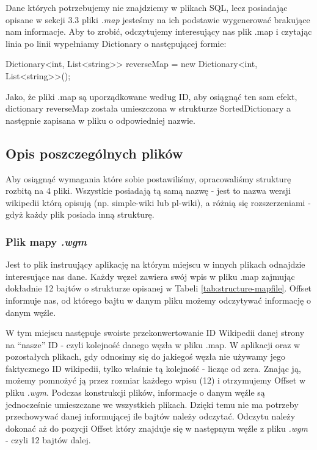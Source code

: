 Dane których potrzebujemy nie znajdziemy w plikach SQL, lecz posiadając opisane w sekcji 3.3 pliki \textit{.map} jesteśmy na ich podstawie wygenerować brakujące nam informacje.
Aby to zrobić, odczytujemy interesujący nas plik .map i czytając linia po linii wypełniamy Dictionary o następującej formie:

Dictionary<int, List<string>> reverseMap = new Dictionary<int, List<string>>();

Jako, że pliki .map są uporządkowane według ID, aby osiągnąć ten sam efekt, dictionary reverseMap została umieszczona w strukturze SortedDictionary a następnie zapisana w pliku o odpowiedniej nazwie.

\subsection{Opis poszczególnych plików}
Aby osiągnąć wymagania które sobie postawiliśmy, opracowaliśmy strukturę rozbitą na 4 pliki. Wszystkie posiadają tą samą nazwę - jest to nazwa wersji wikipedii którą opisują (np. simple-wiki lub pl-wiki), a różnią się rozszerzeniami - gdyż każdy plik posiada inną strukturę.

\subsubsection{Plik mapy \textit{.wgm}}
Jest to plik instruujący aplikację na którym miejscu w innych plikach odnajdzie interesujące nas dane.
Każdy węzeł zawiera swój wpis w pliku .map zajmując dokładnie 12 bajtów o strukturze opisanej w Tabeli \ref{tab:structure-mapfile}. Offset informuje nas, od którego bajtu w danym pliku możemy odczytywać informację o danym węźle.


W tym miejscu następuje swoiste przekonwertowanie ID Wikipedii danej strony na “nasze” ID - czyli kolejność danego węzła w pliku .map. W aplikacji oraz w pozostałych plikach, gdy odnosimy się do jakiegoś węzła nie używamy jego faktycznego ID wikipedii, tylko właśnie tą kolejność - licząc od zera. Znając ją, możemy pomnożyć ją przez rozmiar każdego wpisu (12) i otrzymujemy Offset w pliku \textit{.wgm}.
Podczas konstrukcji plików, informacje o danym węźle są jednocześnie umieszczane we wszystkich plikach. Dzięki temu nie ma potrzeby przechowywać danej informującej ile bajtów należy odczytać. Odczytu należy dokonać aż do pozycji Offset który znajduje się w następnym węźle z pliku \textit{.wgm} - czyli 12 bajtów dalej.

